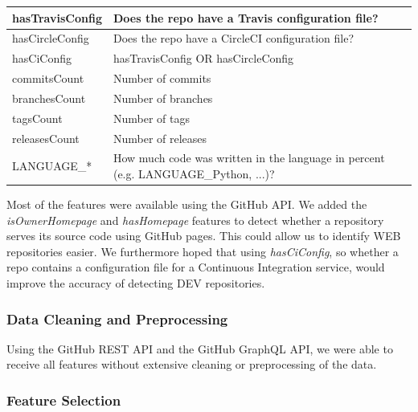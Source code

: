 \documentclass{article}
\begin{document}
\begin{table}[]
\begin{tabularx}{\linewidth}{|l|X|}
hasTravisConfig        & Does the repo have a Travis configuration file?                                    \\ \hline
hasCircleConfig        & Does the repo have a CircleCI configuration file?                                  \\ \hline
hasCiConfig            & hasTravisConfig OR hasCircleConfig                                                 \\ \hline
commitsCount           & Number of commits                                                                  \\ \hline
branchesCount          & Number of branches                                                                 \\ \hline
tagsCount              & Number of tags                                                                     \\ \hline
releasesCount          & Number of releases                                                                 \\ \hline
LANGUAGE\_*            & How much code was written in the language in percent (e.g. LANGUAGE\_Python, ...)? \\ \hline
\end{tabularx}
\end{table}

Most of the features were available using the GitHub API. We added the
\emph{isOwnerHomepage} and \emph{hasHomepage} features to detect whether
a repository serves its source code using GitHub pages. This could allow
us to identify WEB repositories easier. We furthermore hoped that using
\emph{hasCiConfig}, so whether a repo contains a configuration file for
a Continuous Integration service, would improve the accuracy of
detecting DEV repositories.

\subsubsection{Data Cleaning and
Preprocessing}\label{data-cleaning-and-preprocessing}

Using the GitHub REST API and the GitHub GraphQL API, we were able to
receive all features without extensive cleaning or preprocessing of the
data.

\subsubsection{Feature Selection}\label{feature-selection}
\end{document}
